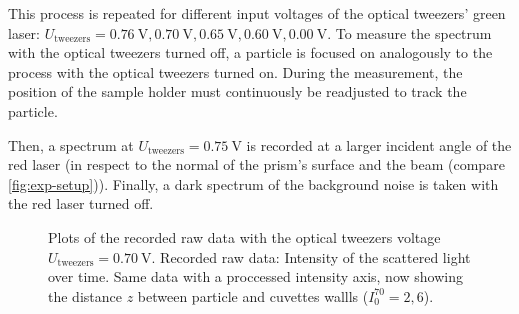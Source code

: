 \documentclass[../bericht.tex]{subfiles}
\begin{document}
      This process is repeated for different input voltages of the optical tweezers' green laser: $U_\mathrm{tweezers}=\SI{0,76}{\volt},\SI{0,70}{\volt},\SI{0,65}{\volt},\SI{0,60}{\volt},\SI{0,00}{\volt}$. To measure the spectrum with the optical tweezers turned off, a particle is focused on analogously to the process with the optical tweezers turned on. During the measurement, the position of the sample holder must continuously be readjusted to track the particle.

      Then, a spectrum at $U_\mathrm{tweezers}=\SI{0,75}{\volt}$ is recorded at a larger incident angle of the red laser (in respect to the normal of the prism's surface and the beam (compare \cref{fig:exp-setup})). Finally, a dark spectrum of the background noise is taken with the red laser turned off.

      \begin{figure}[tb]
        \centering
        \hfill
        \caption{Plots of the recorded raw data with the optical tweezers voltage $U_\mathrm{tweezers}=\SI{0,70}{\volt}$. \protect{} Recorded raw data: Intensity of the scattered light over time. \protect{} Same data with a proccessed intensity axis, now showing the distance $z$ between particle and cuvettes wallls ($I_0^{70}=2,6$).}
        \label{fig:70-i-t-z-t}
      \end{figure}
\end{document}
